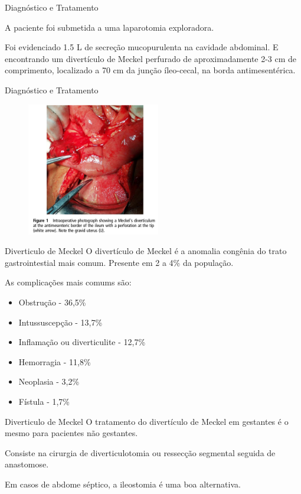 \begin{frame}{Diagnóstico e Tratamento}
    \begin{block}{}
    A paciente foi submetida a uma laparotomia exploradora. 
    \end{block}
    \vspace{5mm} 
    Foi evidenciado 1.5 L de secreção mucopurulenta na cavidade abdominal.\vspace{5mm}
    E encontrando um divertículo de Meckel perfurado de aproximadamente 2-3 cm de comprimento, localizado a 70 cm da junção íleo-cecal, na borda antimesentérica.
\end{frame}

\begin{frame}{Diagnóstico e Tratamento}
    \begin{figure}
        \includegraphics[width=220px]{img/foto.png}
    \end{figure}
\end{frame}


\begin{frame}{Diverticulo de Meckel}
    O divertículo de Meckel é a anomalia congênia do trato gastrointestial mais comum. Presente em 2 a 4\% da população.\vspace{5mm}
    
    As complicações mais comums são:
        \begin{itemize}
            \item Obstrução - 36,5\%
            \item Intussuscepção - 13,7\%
            \item Inflamação ou diverticulite - 12,7\%
            \item Hemorragia - 11,8\%
            \item Neoplasia - 3,2\%
            \item Fístula - 1,7\%
        \end{itemize}
\end{frame}

\begin{frame}{Diverticulo de Meckel}
    O tratamento do divertículo de Meckel em gestantes é o mesmo para pacientes não gestantes. \vspace{5mm}
    
    Consiste na cirurgia de diverticulotomia ou ressecção segmental seguida de anastomose.\vspace{5mm}
    
    Em casos de abdome séptico, a ileostomia é uma boa alternativa.
\end{frame}